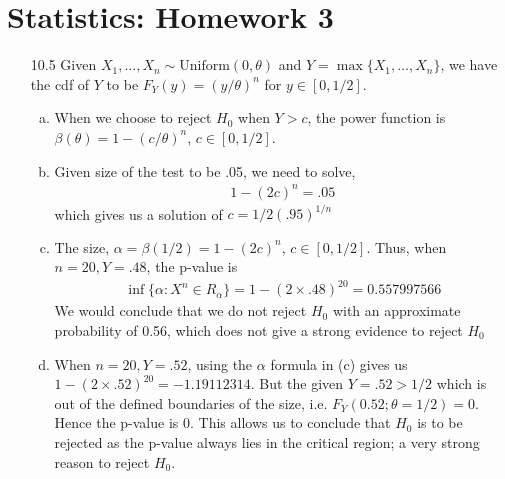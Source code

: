 \documentclass[a4paper,10pt]{article}
\theoremstyle{definition}
\begin{document}
\section*{Statistics: Homework 3}

\begin{enumerate}
\item[10.5] Given $X_1,\ldots,X_n \sim \text{Uniform}(0, \theta)$ and $Y = \max\{X_1,\ldots,X_n\}$, we have the cdf of $Y$ to be $F_Y(y)=(y/\theta)^n$ for $y \in [0,1/2]$.
\begin{enumerate}[(a)]
\item When we choose to reject $H_0$ when $Y>c$, the power function is $\beta(\theta) = 1-(c/\theta)^n$, $c \in [0,1/2]$.
\item Given size of the test to be .05, we need to solve,
\begin{align*}
1-(2c)^n = .05
\end{align*}
which gives us a solution of $c = 1/2(.95)^{1/n}$

\item The size, $\alpha = \beta(1/2) = 1- (2c)^{n}$, $c \in [0,1/2]$. Thus, when $n=20, Y = .48$, the p-value is 
\begin{align*}
\inf\{ \alpha:X^n \in R_\alpha\} = 1-(2 \times.48)^{20} = 0.557997566
\end{align*}
We would conclude that we do not reject $H_0$ with an approximate probability of 0.56, which does not give a strong evidence to reject $H_0$
\item When $n=20, Y = .52$, using the $\alpha$ formula in (c) gives us $1-(2\times.52)^{20} = -1.19112314$. But the given $Y=.52>1/2$ which is out of the defined boundaries of the size, i.e. $F_Y(0.52; \theta=1/2)=0$. Hence the p-value is 0. This allows us to conclude that $H_0$ is to be rejected as the p-value always lies in the critical region; a very strong reason to reject $H_0$.
\end{enumerate}


\end{enumerate}
\end{document}
